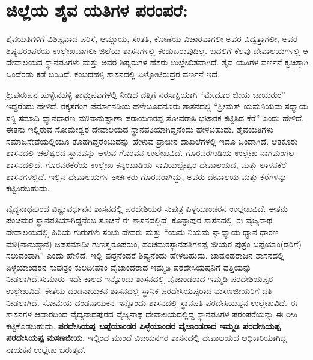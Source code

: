 \section*{ಜಿಲ್ಲೆಯ ಶೈವ ಯತಿಗಳ ಪರಂಪರೆ:}

\vskip -5pt

ಶೈವಯತಿಗಳಿಗೆ ವಿಶಿಷ್ಟವಾದ ಪರಿಸೆ, ಆಮ್ನಾಯ, ಸಂತತಿ, ಕೋಣೆಯ ವಿಚಾರವಾಗಲೀ ಅವರ ವಿದ್ವತ್ತಾಗಲೀ, ಅವರ ಶಿಷ್ಯಪರಂಪರೆಯ ಉಲ್ಲೇಖವಾಗಲೀ ಜಿಲ್ಲೆಯ ಶಾಸನಗಳಲ್ಲಿ ಕಂಡುಬರುವುದಿಲ್ಲ. ಬದಲಿಗೆ ಕೆಲವು ದೇವಾಲಯಗಳಲ್ಲಿ ಆ ದೇವಾಲಯದ ಸ್ಥಾನಪತಿಗಳು ಮತ್ತು ಅವರ ಶಿಷ್ಯರುಗಳ ಹೆಸರು ಉಲ್ಲೇಖಿತವಾಗಿದೆ. ಶೈವ ಯತಿಗಳ ವರ್ಣನೆ ಕ್ವಚಿತ್ತಾಗಿ ಒಂದೆರಡು ಕಡೆ ಬಂದಿದೆ. ಕಂಬದಹಳ್ಳಿ ಶಾಸನದಲ್ಲಿ ಏಳ್ಕೋಟಿರುದ್ರರ ವರ್ಣನೆ ಇದೆ.

ಶ‍್ರೀಪುರುಷನ ಹುಳ್ಳೇನಹಳ್ಳಿ ತಾಮ್ರಪಟಗಳಲ್ಲಿ ನೀಡಿದ ದತ್ತಿಗೆ ನರಸಾಕ್ಷಿಯಾಗಿ “ಮೇದೂರ ಜೀಯ ಚಾಯರುಂ” ಇದ್ದರೆಂದು ಹೇಳಿದೆ. ರಕ್ಕಸಗಂಗ ಪೆರ್ಮಾನಡಿಯ ಹಳೇಬೂದನೂರು ಶಾಸನದಲ್ಲಿ “ಶ‍್ರೀಮತ್​ ಯಮನಿಯಮ ಸಧ್ಯಾಯ ಸನ್ದಿ ಸಮಾಧಿ ಧ್ಯಾನಧಾರಣ ಮೌನಾನುಷ್ಟಾಣಾ ಪರಾಯಣರಪ್ಪ ಸೋವರಾಸಿ ಭಟಾರಕ ಕಟ್ಟಿಸಿದ ಕೆರೆ” ಎಂದು ಹೇಳಿದೆ. ಈತನು ಇಲ್ಲಿರುವ ಸೋಮೇಶ್ವರ ದೇವಾಲಯದ ಸ್ಥಾನಪತಿಯಾಗಿದ್ದನೆಂದು ಹೇಳಬಹುದು. ಶೈವಯತಿಗಳು ಸಮಾಜಸೇವೆಯಲ್ಲಿಯೂ ತೊಡಗಿದ್ದರೆಂಬುದನ್ನು ಹೇಳುವ ಪ್ರಾಚೀನ ದಾಖಲೆಗಳಲ್ಲಿ ಇದೂ ಒಂದಾಗಿದೆ. ಆತಕೂರು ಶಾಸನದಲ್ಲಿ ಚಲ್ಲೆಶ್ವರದ ಸ್ಥಾನವನ್ನು ಆಳುವ ಗೊರವನ ಉಲ್ಲೇಖವಿದೆ. ಗೊರವರಗುಡಿಯ ಉಲ್ಲೇಖ ನಾಗಮಂಗಲ ಶಾಸನದಲ್ಲಿದೆ. ಗೊರವರಕೆರೆಯ ಉಲ್ಲೇಖ ಕನ್ನಂಬಾಡಿಯ ಸಾವಿಯಬ್ಬೇಶ್ವರ ದೇವಾಲಯದ,  ಮತ್ತು ಲಾಳನಕೆರೆ ಶಾಸನಗಳಲ್ಲಿದೆ. ಇಲ್ಲಿನ ದೇವಾಲಯಗಳ ಅರ್ಚಕರು ಗೊರವರಾಗಿದ್ದು, ಅವರು ದೇವಾಲಯ ಮತ್ತು ಕೆರೆಗಳನ್ನು ಕಟ್ಟಿಸಿರಬಹುದು.

ವೈದ್ಯನಾಥಪುರದ ವಿಷ್ಣುವರ್ಧನನ ಶಾಸನದಲ್ಲಿ ಪರದೇಶಿಯರ ಸುಪುತ್ರ ಪಿಳ್ಳೆಯಾಂಡರನ ಉಲ್ಲೇಖವಿದೆ. ಈತನು ಪಂಚಮಠ ಸ್ಥಾನಪತಿಯಾಗಿದ್ದನೆಂಬ ಸೂಚನೆ ಈ ಶಾಸನದಲ್ಲಿದೆ. ಕೊನ್ನಾಪುರ ಶಾಸನದಲ್ಲಿ ಈ ವೈಜ್ಯನಾಥ ದೇವಾಲಯದಲ್ಲಿ ಹಿರಿಯ ಗುರುಗಳು ಸಂಭು ದೇವರು ಮತ್ತು “ಯಮ ನಿಯಮ ಸ್ವಾಧ್ಯಾಯ ಧ್ಯಾನ ಧಾರಣ ಮೌ(ನಾನುಷ್ಠಾನ) ಜಪಸಮಾಧೀ ಗುಣಸ್ವರೂಪರುಂ, ಪಂಚಮಠಸ್ಥಾನಪತಿಗಳಪ್ಪ ಜೀಯರ ಪುತ್ರಂ ಬಪ್ಪೆಯಾಂ(ಡರಿಗೆ) ಸಲುವಂತಾಗಿ” ಎಂದು ಹೇಳಿದೆ. ಇಲ್ಲಿ ಪುತ್ರನೆಂದರೆ ಶಿಷ್ಯನೆಂದು ಹೇಳಬಹುದು. ಚಾವುಂಡರಾಜನ ಶಾಸನದಲ್ಲಿ ಪಿಳ್ಳೆಯಾಂಡರನ ಸುಪುತ್ರಂ ಕುಲದೀಪಕಂ ವೈಜಾಂಡರಾದ ಇಮ್ಮಡಿ ಪರದೇಸಿಯಪ್ಪನಿಗೆ ದತ್ತಿಯನ್ನು ನೀಡಲಾಗಿದೆ.ಸುಮಾರು ಇದೇ ಕಾಲದ ಇನ್ನೊಂದು ಶಾಸನದಲ್ಲಿ ವೈಜಾಂಡರಾದ ಇಮ್ಮಡಿ ಪರದೇಶಿಯಪ್ಪರ ಉಲ್ಲೇಖವಿದೆ. ಕೇತೆಯ ದಂಡನಾಯಕನ ಶಾಸನದಲ್ಲಿ ಸ್ಥಾನಿಕ ಪರದೇಸಿಯಪ್ಪ\break ರಾದ ಮಸಣಜೀಯರಿಗೆ ದತ್ತಿ ನೀಡಲಾಗಿದೆ. ಸೋಮೆಯ ದಂಡನಾಯಕನ ಇನ್ನೊಂದು ಶಾಸನದಲ್ಲಿ ಸ್ಥಾನಪತಿ ಪರದೇಸಿಯಪ್ಪನ ಉಲ್ಲೇಖವಿದೆ. ಈ ಶಾಸನಗಳ ಆಧಾರದಿಂದ ವೈದ್ಯನಾಥಪುರದ ವೈಜ್ಯನಾಥ ದೇವಾಲಯದಲ್ಲಿದ್ದ ಸ್ಥಾನಪತಿಗಳ ಪರಂಪರೆ\-ಯನ್ನು ಈ ರೀತಿ ಕಟ್ಟಿಕೊಡಬಹುದು. \textbf{ಪರದೇಸಿಯಪ್ಪ \general{\enginline{-}} ಬಪ್ಪೆಯಾಂಡರ \general{\enginline{-}} ಪಿಳ್ಳೆಯಾಂಡರ \general{\enginline{-}} ವೈಜಾಂಡರಾದ ಇಮ್ಮಡಿ ಪರದೇಸಿಯಪ್ಪ \general{\enginline{-}} ಪರದೇಸಿಯಪ್ಪ \general{\enginline{-}} ಮಸಣಜೀಯ.} ಇಲ್ಲಿಂದ ಮುಂದೆ ವಿಜಯನಗರ ಶಾಸನದಲ್ಲಿ ದೇವಾಲಯದ ಅಧಿಕಾರಿಯಾಗಿದ್ದ ನಾಯಕನ ಉಲ್ಲೇಖ ಬರುತ್ತದೆ.


